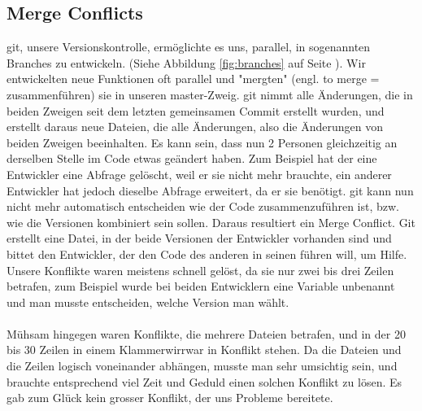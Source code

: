 \documentclass[12pt,a4paper]{scrartcl}
\begin{document}
\subsection{Merge Conflicts}
git, unsere Versionskontrolle, ermöglichte es uns, parallel, in sogenannten Branches zu entwickeln. (Siehe Abbildung \ref{fig:branches} auf Seite \pageref{fig:branches}). Wir entwickelten neue Funktionen oft parallel und "mergten" (engl. to merge = zusammenführen) sie in unseren master-Zweig.
git nimmt alle Änderungen, die in beiden Zweigen seit dem letzten gemeinsamen Commit erstellt wurden, und erstellt daraus neue Dateien, die alle Änderungen,
also die Änderungen von beiden Zweigen beeinhalten. Es kann sein, dass nun 2 Personen gleichzeitig an derselben Stelle im Code etwas geändert haben. Zum Beispiel
hat der eine Entwickler eine Abfrage gelöscht, weil er sie nicht mehr brauchte, ein anderer Entwickler hat jedoch dieselbe Abfrage erweitert, da er sie benötigt.
git kann nun nicht mehr automatisch entscheiden wie der Code zusammenzuführen ist, bzw. wie die Versionen kombiniert sein sollen. Daraus resultiert ein Merge
Conflict. Git erstellt eine Datei, in der beide Versionen der Entwickler vorhanden sind und bittet den Entwickler, der den Code des anderen in seinen führen
will, um Hilfe. Unsere Konflikte waren meistens schnell gelöst, da sie nur zwei bis drei Zeilen betrafen, zum Beispiel wurde bei beiden Entwicklern
eine Variable unbenannt und man musste entscheiden, welche Version man wählt.\\
\\
Mühsam hingegen waren Konflikte, die mehrere Dateien betrafen, und in der 20 bis 30 Zeilen in einem Klammerwirrwar in Konflikt stehen. Da die Dateien und die Zeilen
logisch voneinander abhängen, musste man sehr umsichtig sein, und brauchte entsprechend viel Zeit und Geduld einen solchen Konflikt zu lösen. Es gab zum Glück kein
grosser Konflikt, der uns Probleme bereitete.
\newpage
\end{document}
